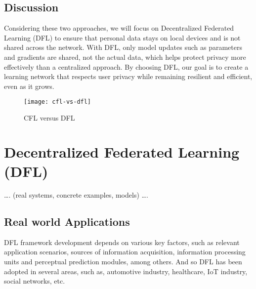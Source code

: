 \subsection{Discussion}
\label{sub:discussion}

Considering these two approaches, we will focus on Decentralized Federated Learning (\gls{DFL}) to ensure that personal data stays on local devices and is not shared across the network. With \gls{DFL}, only model updates such as parameters and gradients are shared, not the actual data, which helps protect privacy more effectively than a centralized approach.
By choosing \gls{DFL}, our goal is to create a learning network that respects user privacy while remaining resilient and efficient, even as it grows.

\begin{figure}[htbp]
  \centering
  \texttt{[image: cfl-vs-dfl]}
  \caption{CFL versus DFL}
  \label{fig:dfl_vs_cfl}
\end{figure}

\section{Decentralized Federated Learning (DFL)}
\label{sub:decentralized_federated_learning_2}

…. (real systems, concrete examples, models) ….


\subsection{Real world Applications}
\label{sub:real_worl_applications}

DFL framework development depends on various key factors, such as relevant application scenarios, sources of information acquisition, information processing units and perceptual prediction modules, among others. And so DFL has been adopted in several areas, such as, automotive industry, healthcare, IoT industry, social networks, etc.

